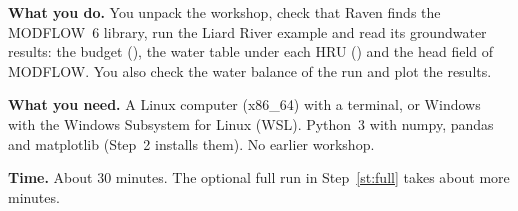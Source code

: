 \begin{goal}
\textbf{What you do.} You unpack the workshop, check that Raven finds the MODFLOW~6 library, run the Liard River example
and read its groundwater results: the budget (), the water table under each HRU ()
and the head field of MODFLOW. You also check the water balance of the run and plot the results.

\textbf{What you need.} A Linux computer (x86\_64) with a terminal, or Windows with the Windows Subsystem for Linux
(WSL). Python~3 with numpy, pandas and matplotlib (Step~2 installs them). No earlier workshop.

\textbf{Time.} About 30 minutes. The optional full run in Step~\ref{st:full} takes about  more minutes.
\end{goal}
